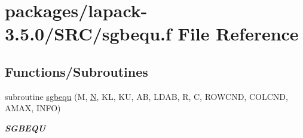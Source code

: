\hypertarget{sgbequ_8f}{}\section{packages/lapack-\/3.5.0/\+S\+R\+C/sgbequ.f File Reference}
\label{sgbequ_8f}
\subsection*{Functions/\+Subroutines}
\begin{DoxyCompactItemize}
\item 
subroutine \hyperlink{group__realGBcomputational_gad6b951dfd2b71d1eb527d5f41da07ed2}{sgbequ} (M, \hyperlink{polmisc_8c_a0240ac851181b84ac374872dc5434ee4}{N}, K\+L, K\+U, A\+B, L\+D\+A\+B, R, C, R\+O\+W\+C\+N\+D, C\+O\+L\+C\+N\+D, A\+M\+A\+X, I\+N\+F\+O)
\begin{DoxyCompactList}\small\item\em {\bfseries S\+G\+B\+E\+Q\+U} \end{DoxyCompactList}\end{DoxyCompactItemize}
